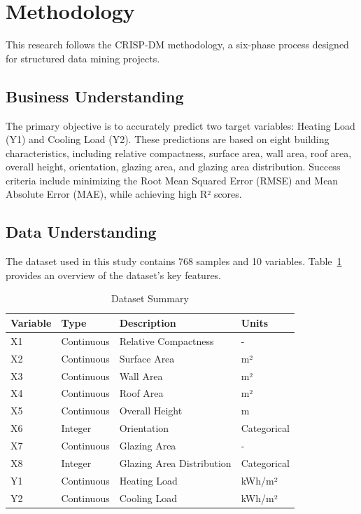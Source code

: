 \documentclass[12pt]{article}
\begin{document}
\section{Methodology}
This research follows the CRISP-DM methodology, a six-phase process designed for structured data mining projects.

\subsection{Business Understanding}
The primary objective is to accurately predict two target variables: Heating Load (Y1) and Cooling Load (Y2). These predictions are based on eight building characteristics, including relative compactness, surface area, wall area, roof area, overall height, orientation, glazing area, and glazing area distribution. Success criteria include minimizing the Root Mean Squared Error (RMSE) and Mean Absolute Error (MAE), while achieving high R² scores.

\subsection{Data Understanding}
The dataset used in this study contains 768 samples and 10 variables. Table~\ref{tab:dataset_summary} provides an overview of the dataset's key features.

\begin{table}[H]
    \centering
    \caption{Dataset Summary}
    \label{tab:dataset_summary}
    \begin{tabular}{l l l l}
        \toprule
        \textbf{Variable} & \textbf{Type} & \textbf{Description} & \textbf{Units} \\
        \midrule
        X1 & Continuous & Relative Compactness & - \\
        X2 & Continuous & Surface Area & m² \\
        X3 & Continuous & Wall Area & m² \\
        X4 & Continuous & Roof Area & m² \\
        X5 & Continuous & Overall Height & m \\
        X6 & Integer & Orientation & Categorical \\
        X7 & Continuous & Glazing Area & - \\
        X8 & Integer & Glazing Area Distribution & Categorical \\
        Y1 & Continuous & Heating Load & kWh/m² \\
        Y2 & Continuous & Cooling Load & kWh/m² \\
        \bottomrule
    \end{tabular}
\end{table}
\end{document}
